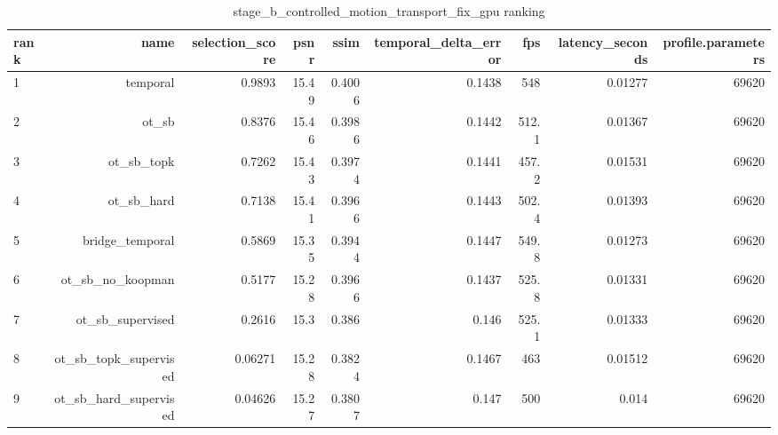 \begin{table}[t]
\centering
\caption{stage\_b\_controlled\_motion\_transport\_fix\_gpu ranking}
\begin{tabular}{lrrrrrrrr}
\toprule
rank & name & selection\_score & psnr & ssim & temporal\_delta\_error & fps & latency\_seconds & profile.parameters \\
\midrule
1 & temporal & 0.9893 & 15.49 & 0.4006 & 0.1438 & 548 & 0.01277 & 69620 \\
2 & ot\_sb & 0.8376 & 15.46 & 0.3986 & 0.1442 & 512.1 & 0.01367 & 69620 \\
3 & ot\_sb\_topk & 0.7262 & 15.43 & 0.3974 & 0.1441 & 457.2 & 0.01531 & 69620 \\
4 & ot\_sb\_hard & 0.7138 & 15.41 & 0.3966 & 0.1443 & 502.4 & 0.01393 & 69620 \\
5 & bridge\_temporal & 0.5869 & 15.35 & 0.3944 & 0.1447 & 549.8 & 0.01273 & 69620 \\
6 & ot\_sb\_no\_koopman & 0.5177 & 15.28 & 0.3966 & 0.1437 & 525.8 & 0.01331 & 69620 \\
7 & ot\_sb\_supervised & 0.2616 & 15.3 & 0.386 & 0.146 & 525.1 & 0.01333 & 69620 \\
8 & ot\_sb\_topk\_supervised & 0.06271 & 15.28 & 0.3824 & 0.1467 & 463 & 0.01512 & 69620 \\
9 & ot\_sb\_hard\_supervised & 0.04626 & 15.27 & 0.3807 & 0.147 & 500 & 0.014 & 69620 \\
\bottomrule
\end{tabular}
\end{table}
